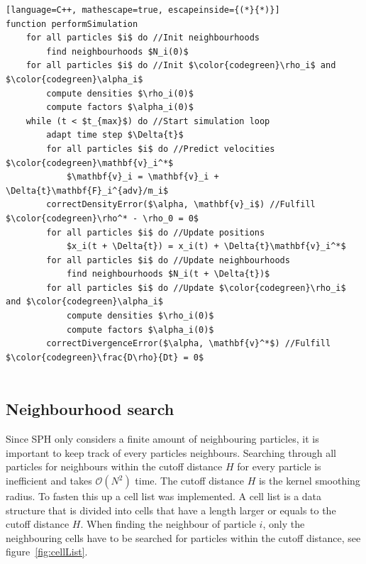 \documentclass[journal]{vgtc}                %
\begin{document}
\begin{lstlisting}[language=C++, mathescape=true, escapeinside={(*}{*)}]
function performSimulation
    for all particles $i$ do //Init neighbourhoods
        find neighbourhoods $N_i(0)$
    for all particles $i$ do //Init $\color{codegreen}\rho_i$ and $\color{codegreen}\alpha_i$
        compute densities $\rho_i(0)$
        compute factors $\alpha_i(0)$
    while (t < $t_{max}$) do //Start simulation loop
        adapt time step $\Delta{t}$ 
        for all particles $i$ do //Predict velocities $\color{codegreen}\mathbf{v}_i^*$
            $\mathbf{v}_i = \mathbf{v}_i + \Delta{t}\mathbf{F}_i^{adv}/m_i$
        correctDensityError($\alpha, \mathbf{v}_i$) //Fulfill $\color{codegreen}\rho^* - \rho_0 = 0$
        for all particles $i$ do //Update positions
            $x_i(t + \Delta{t}) = x_i(t) + \Delta{t}\mathbf{v}_i^*$
        for all particles $i$ do //Update neighbourhoods
            find neighbourhoods $N_i(t + \Delta{t})$
        for all particles $i$ do //Update $\color{codegreen}\rho_i$ and $\color{codegreen}\alpha_i$ 
            compute densities $\rho_i(0)$
            compute factors $\alpha_i(0)$
        correctDivergenceError($\alpha, \mathbf{v}^*$) //Fulfill $\color{codegreen}\frac{D\rho}{Dt} = 0$


\end{lstlisting}

\subsection{Neighbourhood search}
    Since SPH only considers a finite amount of neighbouring particles, it is important to keep track of every particles neighbours.
    Searching through all particles for neighbours within the cutoff distance $H$ for every particle is inefficient and takes $\mathcal{O}({N^2})$ time.
    The cutoff distance $H$ is the kernel smoothing radius.
    To fasten this up a cell list was implemented.
    A cell list is a data structure that is divided into cells that have a length larger or equals to the cutoff distance $H$.
    When finding the neighbour of particle $i$, only the neighbouring cells have to be searched for particles within the cutoff distance, see figure~\ref{fig:cellList}.
    
\end{document}
